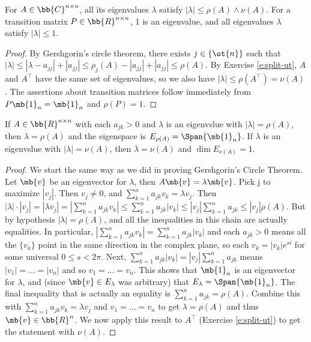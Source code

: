 \begin{corollary}\label{c:gershgorin}
For $A \in \bb{C}^{n \times n}$, all its eigenvalues $\lambda$ satisfy $| \lambda| \leq \rho(A) \wedge \nu(A)$.
For a transition matrix $P \in \bb{R}^{n \times n}$, 1 is an eigenvalue, and all eigenvalues $\lambda$ satisfy $| \lambda| \leq 1$.
\end{corollary}
\begin{proof}%
By Gershgorin's circle theorem, there exists $j \in \{ \ot{n}\}$ such that $| \lambda| \leq | \lambda -a_{jj}|+|a_{jj}| \leq \rho_j(A)-|a_{jj}|+|a_{jj}| \leq \rho(A)$.
By Exercise \ref{e:split-ut}, $A$ and $A^\top$ have the same set of eigenvalues, so we also have $| \lambda| \leq \rho(A^\top)= \nu(A)$.
The assertions about transition matrices follow immediately from $P \mb{1}_n= \mb{1}_n$ and $\rho(P)=1$.
\end{proof}
\begin{prop}\label{p:rowsum-evec}
If $A \in \bb{R}^{n \times n}$ with each $a_{jk}>0$ and $\lambda$ is an eigenvslue with $| \lambda|= \rho(A)$, then $\lambda= \rho(A)$ and the eigenspace is $E_{\rho(A)}= \Span \{ \mb{1}_n \}$.
If $\lambda$ is an eigenvslue with $| \lambda|= \nu(A)$, then $\lambda= \nu(A)$ and $\dim E_{\nu(A)}=1$.
\end{prop}
\begin{proof}
We start the same way as we did in proving Gershgorin's Circle Theorem. Let $\mb{v}$ be an eigenvector for $\lambda$, then $A \mb{v}= \lambda \mb{v}$.
Pick j to maximize $|v_j|$. Then $v_j \neq 0$, and $\sum_{k=1}^na_{jk}v_k= \lambda v_j$. Then $| \lambda| \cdot|v_j|=| \lambda v_j|=| \sum_{k=1}^na_{jk}v_k| \leq \sum_{k=1}^na_{jk}|v_k| \leq |v_j| \sum_{k=1}^na_{jk}\leq |v_j| \rho(A)$.
But by hypothesis $| \lambda|= \rho(A)$, and all the inequalities in this chain are actually equalities. In particular, $| \sum_{k=1}^na_{jk}v_k|= \sum_{k=1}^na_{jk}|v_k|$ and each $a_{jk}>0$ means all the $\{ v_k \}$ point in the same direction in the complex plane, so each $v_k=|v_k|e^{si}$ for some universal $0 \leq s<2 \pi$.
Next, $\sum_{k=1}^na_{jk}|v_k|=|v_j| \sum_{k=1}^na_{jk}$ means $|v_1|= \ldots=|v_n|$ and so $v_1= \ldots=v_n$. This shows that $\mb{1}_n$ is an eigenvector for $\lambda$, and (since $\mb{v}\in E_\lambda$ was arbitrary) that $E_\lambda= \Span \{ \mb{1}_n \}$.
The final inequality that is actually an equality is $\sum_{k=1}^na_{jk}= \rho(A)$. Combine this with $\sum_{k=1}^na_{jk}v_k= \lambda v_j$ and $v_1= \ldots=v_n$ to get $\lambda= \rho(A)$ and thus $\mb{v}\in \bb{R}^n$.
We now apply this result to $A^\top$ (Exercise \ref{e:split-ut}) to get the statement with $\nu(A)$.
\end{proof}
